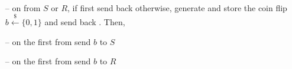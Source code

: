 \begin{minipage}{0.5\textwidth}
\begin{bbox}[title={Functionality $\F_\m{flip}(S,R)$}]
~
\begin{itemize}[leftmargin=*]
\item[--] on  from $S$ or $R$, if first  send back  otherwise, generate and store the coin flip $b \xleftarrow{\$} \{0,1\}$ and send back . Then,
\item[--] on the first  from \A send $b$ to $S$
\item[--] on the first  from \A send $b$ to $R$
\end{itemize}
\end{bbox}
\end{minipage}
